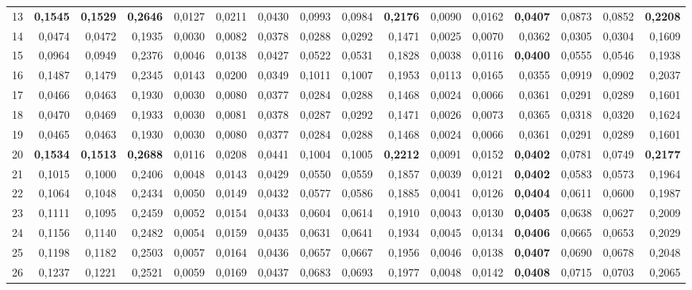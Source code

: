 \begin{table}[htp!]
\begin{adjustwidth}{-2cm}{}
\begin{tabular}{ l | *{15}{| r}}
13	&	\textbf{0,1545}	&	\textbf{0,1529}	&	\textbf{0,2646}	&	0,0127	&	0,0211	&	0,0430	&	0,0993	&	0,0984	&	\textbf{0,2176}	&	0,0090	&	0,0162	&	\textbf{0,0407}	&	0,0873	&	0,0852	&	\textbf{0,2208}	\\
14	&	0,0474	&	0,0472	&	0,1935	&	0,0030	&	0,0082	&	0,0378	&	0,0288	&	0,0292	&	0,1471	&	0,0025	&	0,0070	&	0,0362	&	0,0305	&	0,0304	&	0,1609	\\
15	&	0,0964	&	0,0949	&	0,2376	&	0,0046	&	0,0138	&	0,0427	&	0,0522	&	0,0531	&	0,1828	&	0,0038	&	0,0116	&	\textbf{0,0400}	&	0,0555	&	0,0546	&	0,1938	\\
16	&	0,1487	&	0,1479	&	0,2345	&	0,0143	&	0,0200	&	0,0349	&	0,1011	&	0,1007	&	0,1953	&	0,0113	&	0,0165	&	0,0355	&	0,0919	&	0,0902	&	0,2037	\\
17	&	0,0466	&	0,0463	&	0,1930	&	0,0030	&	0,0080	&	0,0377	&	0,0284	&	0,0288	&	0,1468	&	0,0024	&	0,0066	&	0,0361	&	0,0291	&	0,0289	&	0,1601	\\
18	&	0,0470	&	0,0469	&	0,1933	&	0,0030	&	0,0081	&	0,0378	&	0,0287	&	0,0292	&	0,1471	&	0,0026	&	0,0073	&	0,0365	&	0,0318	&	0,0320	&	0,1624	\\
19	&	0,0465	&	0,0463	&	0,1930	&	0,0030	&	0,0080	&	0,0377	&	0,0284	&	0,0288	&	0,1468	&	0,0024	&	0,0066	&	0,0361	&	0,0291	&	0,0289	&	0,1601	\\
20	&	\textbf{0,1534}	&	\textbf{0,1513}	&	\textbf{0,2688}	&	0,0116	&	0,0208	&	0,0441	&	0,1004	&	0,1005	&	\textbf{0,2212}	&	0,0091	&	0,0152	&	\textbf{0,0402}	&	0,0781	&	0,0749	&	\textbf{0,2177}	\\
21	&	0,1015	&	0,1000	&	0,2406	&	0,0048	&	0,0143	&	0,0429	&	0,0550	&	0,0559	&	0,1857	&	0,0039	&	0,0121	&	\textbf{0,0402}	&	0,0583	&	0,0573	&	0,1964	\\
22	&	0,1064	&	0,1048	&	0,2434	&	0,0050	&	0,0149	&	0,0432	&	0,0577	&	0,0586	&	0,1885	&	0,0041	&	0,0126	&	\textbf{0,0404}	&	0,0611	&	0,0600	&	0,1987	\\
23	&	0,1111	&	0,1095	&	0,2459	&	0,0052	&	0,0154	&	0,0433	&	0,0604	&	0,0614	&	0,1910	&	0,0043	&	0,0130	&	\textbf{0,0405}	&	0,0638	&	0,0627	&	0,2009	\\
24	&	0,1156	&	0,1140	&	0,2482	&	0,0054	&	0,0159	&	0,0435	&	0,0631	&	0,0641	&	0,1934	&	0,0045	&	0,0134	&	\textbf{0,0406}	&	0,0665	&	0,0653	&	0,2029	\\
25	&	0,1198	&	0,1182	&	0,2503	&	0,0057	&	0,0164	&	0,0436	&	0,0657	&	0,0667	&	0,1956	&	0,0046	&	0,0138	&	\textbf{0,0407}	&	0,0690	&	0,0678	&	0,2048	\\
26	&	0,1237	&	0,1221	&	0,2521	&	0,0059	&	0,0169	&	0,0437	&	0,0683	&	0,0693	&	0,1977	&	0,0048	&	0,0142	&	\textbf{0,0408}	&	0,0715	&	0,0703	&	0,2065	\\

\end{tabular}
\end{adjustwidth}
\end{table}
